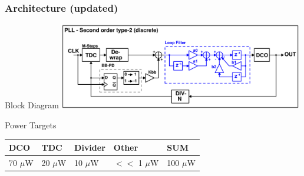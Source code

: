 \documentclass[t, screen, aspectratio=43]{beamer}
\begin{document}
\begin{frame}
	\frametitle{Architecture (updated)}
	\begin{block}{Block Diagram}
	\center\includegraphics[width=0.8\textwidth, angle=0]{pll_sec_order_bb.pdf}

	\end{block}
		\begin{block}{Power Targets}
		\vspace{-.1em}
		\begin{table}[htb!]
			\tiny
			\centering
			\def\arraystretch{1.5}		
			\setlength\arrayrulewidth{0.75pt}
			\setlength{\tabcolsep}{1em} %
			\begin{tabular}{|l|l|l|l|l|}
				\hline 
				\rule[-1ex]{0pt}{2.5ex} \cellcolor{gray!40}\textbf{DCO} & \cellcolor{gray!40}\textbf{TDC} & \cellcolor{gray!40}\textbf{Divider }& \cellcolor{gray!40}\textbf{Other} & \cellcolor{gray!40}\textbf{SUM} \\ 
				\hline 
				\rule[-1ex]{0pt}{2.5ex} 70 $\mu$W& 20 $\mu$W & 10 $\mu$W & $<<$ 1 $\mu$W & 100 $\mu$W\\ 
				\hline 
			\end{tabular} 
		\end{table}   
	\end{block}

\end{frame}


\end{document}
